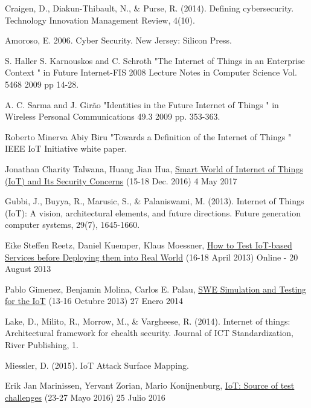 \documentclass[a4paper,english,11pt]{article}
\begin{document}
		
	\begin{thebibliography}{9}	
		
		Craigen, D., Diakun-Thibault, N., \& Purse, R. (2014). Defining cybersecurity. Technology Innovation Management Review, 4(10).
		
		Amoroso, E. 2006. Cyber Security. New Jersey: Silicon Press.
		
		S. Haller S. Karnouskos and C. Schroth "The Internet of Things in an Enterprise Context " in Future Internet-FIS 2008 Lecture Notes in Computer Science Vol. 5468 2009 pp 14-28.
		
		A. C. Sarma and J. Girão "Identities in the Future Internet of Things " in Wireless Personal Communications 49.3 2009 pp. 353-363.
		
		Roberto Minerva Abiy Biru "Towards a Definition of the Internet of Things " IEEE IoT Initiative white paper.
		
		Jonathan Charity Talwana, Huang Jian Hua, \href{http://ieeexplore.ieee.org/document/7917092/}{Smart World of Internet of Things (IoT) and Its Security Concerns} (15-18 Dec. 2016) 4 May 2017
		
		Gubbi, J., Buyya, R., Marusic, S., \& Palaniswami, M. (2013). Internet of Things (IoT): A vision, architectural elements, and future directions. Future generation computer systems, 29(7), 1645-1660.
		
		Eike Steffen Reetz, Daniel Kuemper, Klaus Moessner, \href{http://ieeexplore.ieee.org/document/6582811/}{How to Test IoT-based Services before Deploying them into Real World} (16-18 April 2013) Online - 20 August 2013
		
		Pablo Gimenez, Benjamin Molina, Carlos E. Palau, \href{http://ieeexplore.ieee.org/document/6721820/}{SWE Simulation and Testing for the IoT} (13-16 Octubre 2013) 27 Enero 2014
		
		Lake, D., Milito, R., Morrow, M., \& Vargheese, R. (2014). Internet of things: Architectural framework for ehealth security. Journal of ICT Standardization, River Publishing, 1.
		
		Miessler, D. (2015). IoT Attack Surface Mapping.
		
		Erik Jan Marinissen, Yervant Zorian, Mario Konijnenburg, \href{http://ieeexplore.ieee.org/document/7519331/}{IoT: Source of test challenges} (23-27 Mayo 2016) 25 Julio 2016
		

\end{thebibliography}
\end{document}
